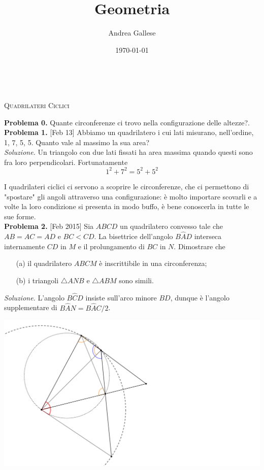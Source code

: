 \documentclass[a4paper]{article}
\title{Geometria}\let\Title\@title
\author{Andrea Gallese}\let\Author\@author
\date{\today}\let\Date\@date
\newcommand{\Intitola}{\begin{center}
		\vspace*{0,5 cm}
		{\Huge \textsc{\Title}} \\
		\vspace{0,5 cm}
		\textsc{\Author} \hspace{1cm} \textsc{\Date}
		\thispagestyle{empty}
		\vspace{0,7 cm}
\end{center}}
\theoremstyle{remark}
\theoremstyle{definition}
\begin{document}
\Intitola
\small
\begin{multicols}{2}
\begin{center}
	\textsc{Quadrilateri Ciclici}
\end{center}

\textbf{Problema 0.} Quante circonferenze ci trovo nella configurazione delle altezze?. \\

\textbf{Problema 1.} [Feb 13] Abbiamo un quadrilatero i cui lati misurano, nell’ordine, 1, 7, 5, 5. Quanto vale al massimo la sua area? \\

\emph{Soluzione.} Un triangolo con due lati fissati ha area massima quando questi sono fra loro perpendicolari. Fortunatamente \[ 1^2 + 7^2 = 5^2 + 5^2 \]
	
\textsf{I quadrilateri ciclici ci servono a scoprire le circonferenze, che ci permettono di "spostare" gli angoli attraverso una configurazione: è molto importare scovarli e a volte la loro condizione si presenta in modo buffo, è bene conoscerla in tutte le sue forme.} \\

\textbf{Problema 2.} [Feb 2015] Sia $ ABCD $ un quadrilatero convesso tale che $ AB = AC = AD $ e $ BC < CD $. La bisettrice dell’angolo $ B\hat{A}D $ interseca internamente $ CD $ in $ M $ e il prolungamento di $ BC $ in $ N $. Dimostrare che
\begin{itemize}
	\item [(a)] il quadrilatero $ ABCM $ è inscrittibile in una circonferenza;
	\item [(b)] i triangoli $ \bigtriangleup ANB $ e $ \bigtriangleup ABM $ sono simili.
\end{itemize}


\emph{Soluzione.} L'angolo $ B\hat{C}D $ insiste sull'arco minore $ BD $, dunque è l'angolo supplementare di $ B\hat{A}N = B\hat{A}C / 2 $.

\begin{center}
	\includegraphics[scale=0.2]{baah}
\end{center}


\end{multicols}
\end{document}
